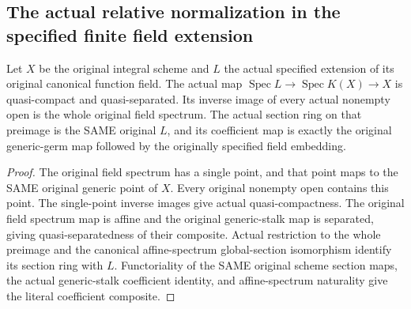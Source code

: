 \subsection{The actual relative normalization in the specified finite field extension}

\begin{lemma}
\label{lem:actual-specified-field-generic-morphism}
\leanok
Let $X$ be the original integral scheme and $L$ the actual specified
extension of its original canonical function field. The actual map
$\operatorname{Spec}L\to\operatorname{Spec}K(X)\to X$ is
quasi-compact and quasi-separated. Its inverse image of every actual
nonempty open is the whole original field spectrum. The actual section
ring on that preimage is the SAME original $L$, and its coefficient
map is exactly the original generic-germ map followed by the originally
specified field embedding.
\end{lemma}
\begin{proof}
The original field spectrum has a single point, and that point maps
to the SAME original generic point of $X$. Every original nonempty
open contains this point. The single-point inverse images give actual
quasi-compactness. The original field spectrum map is affine and the
original generic-stalk map is separated, giving quasi-separatedness
of their composite. Actual restriction to the whole preimage and the
canonical affine-spectrum global-section isomorphism identify its
section ring with $L$. Functoriality of the SAME original scheme
section maps, the actual generic-stalk coefficient identity, and
affine-spectrum naturality give the literal coefficient composite.
\end{proof}
